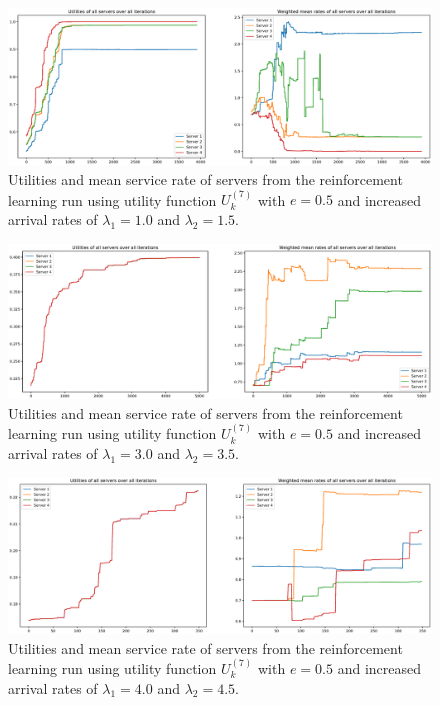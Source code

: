 \begin{figure}[H]
    \includegraphics[width=\textwidth]{chapters/00_appendix/03_more_rl_results/Bin/utility_7_eps/u7_6_e05_Lambda_25.eps}
    \caption{Utilities and mean service rate of servers from the reinforcement
    learning run using utility function \(U_k^{(7)}\) with \(e = 0.5\) and
    increased arrival rates of \(\lambda_1 = 1.0\) and \(\lambda_2 = 1.5\).}
    \label{fig:RL_utility7_6_e05_Lambda_25}
\end{figure}

\begin{figure}[H]
    \includegraphics[width=\textwidth]{chapters/00_appendix/03_more_rl_results/Bin/utility_7_eps/u7_6_e05_Lambda_65.eps}
    \caption{Utilities and mean service rate of servers from the reinforcement
    learning run using utility function \(U_k^{(7)}\) with \(e = 0.5\) and
    increased arrival rates of \(\lambda_1 = 3.0\) and \(\lambda_2 = 3.5\).}
    \label{fig:RL_utility7_6_e05_Lambda_65}
\end{figure}

\begin{figure}[H]
    \includegraphics[width=\textwidth]{chapters/00_appendix/03_more_rl_results/Bin/utility_7_eps/u7_6_e05_Lambda_85.eps}
    \caption{Utilities and mean service rate of servers from the reinforcement
    learning run using utility function \(U_k^{(7)}\) with \(e = 0.5\) and
    increased arrival rates of \(\lambda_1 = 4.0\) and \(\lambda_2 = 4.5\).}
    \label{fig:RL_utility7_6_e05_Lambda_85}
\end{figure}